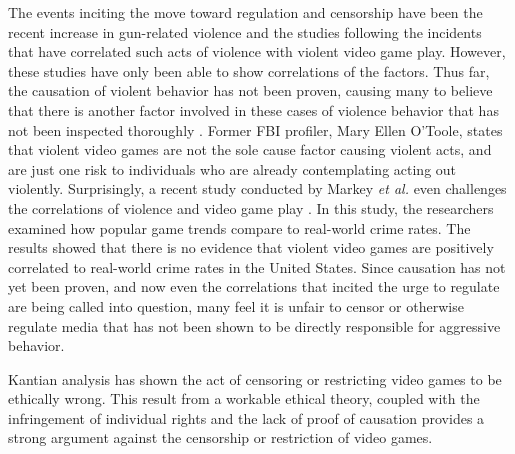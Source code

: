The events inciting the move toward regulation and censorship have been the recent increase in gun-related violence and the studies following the incidents that have correlated such acts of violence with violent video game play. However, these studies have only been able to show correlations of the factors. Thus far, the causation of violent behavior has not been proven, causing many to believe that there is another factor involved in these cases of violence behavior that has not been inspected thoroughly \cite{ferguson2013, ferguson2008}. Former FBI profiler, Mary Ellen O'Toole, states that violent video games are not the sole cause factor causing violent acts, and are just one risk to individuals who are already contemplating acting out violently\cite{makuch2013}. Surprisingly, a recent study conducted by Markey \textit{et al.} even challenges the correlations of violence and video game play \cite{markey2014}. In this study, the researchers examined how popular game trends compare to real-world crime rates. The results showed that there is no evidence that violent video games are positively correlated to real-world crime rates in the United States. Since causation has not yet been proven, and now even the correlations that incited the urge to regulate are being called into question, many feel it is unfair to censor or otherwise regulate media that has not been shown to be directly responsible for aggressive behavior. 

Kantian analysis has shown the act of censoring or restricting video games to be ethically wrong. This result from a workable ethical theory, coupled with the infringement of individual rights and the lack of proof of causation provides a strong argument against the censorship or restriction of video games.


